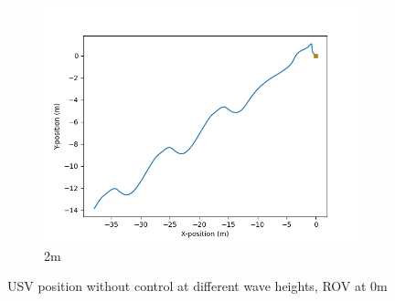 \documentclass[class=article, crop=false]{standalone}
\begin{document}
\begin{figure}
\begin{subfigure}[b]{0.48\textwidth}
        \centering
        \includegraphics{scenario1/rov-0m/2.0m/usv_position_uncontrolled}
        \caption{2m}
        \label{}
    \end{subfigure}

    \caption{USV position without control at different wave heights, ROV at 0m}
\end{figure}
\end{document}
